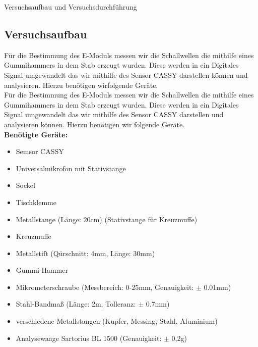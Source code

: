 \documentclass[twoside]{protokoll}
\begin{document}
\begin{aufgabe}{Versuchsaufbau und Versuchsdurchführung}
\subsection{Versuchsaufbau}
  Für die Bestimmung des E-Moduls messen wir die Schallwellen die mithilfe eines Gummihammers in dem Stab erzeugt wurden.
    Diese werden in ein Digitales Signal umgewandelt das wir mithilfe des Sensor CASSY darstellen können und analysieren.
    Hierzu benötigen wirfolgende Geräte.\\

    Für die Bestimmung des E-Moduls messen wir die Schallwellen die mithilfe eines Gummihammers in dem Stab erzeugt wurden.
    Diese werden in ein Digitales Signal umgewandelt das wir mithilfe des Sensor CASSY darstellen und analysieren können.
    Hierzu benötigen wir folgende Geräte.\\

\textbf{Benötigte Geräte:}
\begin{itemize}
\item Semsor CASSY
\item Universalmikrofon mit Stativstange
\item Sockel
\item Tischklemme
\item Metallstange (Länge: 20cm) (Stativstange für Kreuzmuffe)
\item Kreuzmuffe
\item Metallstift (Qürschnitt: 4mm, Länge: 30mm)
\item Gummi-Hammer
\item Mikrometerschraube (Messbereich: 0-25mm, Genauigkeit: $\pm$ 0.01mm)
\item Stahl-Bandmaß (Länge: 2m, Tolleranz: $\pm$ 0.7mm)
\item verschiedene Metallstangen (Kupfer, Messing, Stahl, Aluminium)
\item Analysewaage Sartorius BL 1500 (Genauigkeit: $\pm$ 0,2g)
\end{itemize}



\end{aufgabe}
\end{document}
